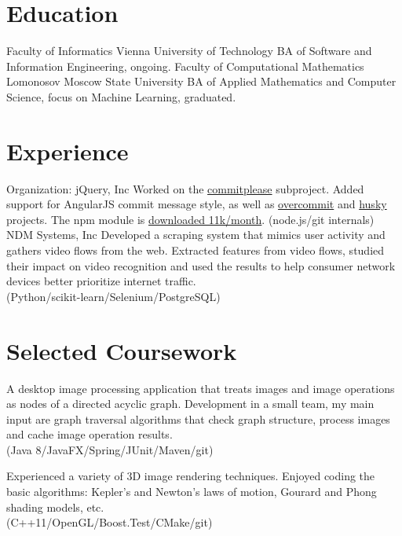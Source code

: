 \documentclass[11pt,a4paper,oneside,roman]{moderncv}
\begin{document}
\makecvtitle

\section{Education}
        {Faculty of Informatics}
        {Vienna University of Technology}
        {}{}
        {BA of Software and Information Engineering, ongoing.}
        {Faculty of Computational Mathematics}
        {Lomonosov Moscow State University}
        {}{}
        {BA of Applied Mathematics and Computer Science, focus on Machine Learning, graduated.}
\section{Experience}
        {Organization: jQuery, Inc}{}
        {}{Worked on the \href{https://github.com/jzaefferer/commitplease/}{commitplease} subproject. Added support for AngularJS commit message style, as well as \href{https://github.com/brigade/overcommit}{overcommit} and \href{https://github.com/typicode/husky}{husky} projects. The npm module is \href{https://www.npmjs.com/package/commitplease}{downloaded 11k/month}. (node.js/git internals)}
        {NDM Systems, Inc}
        {}{}
        {Developed a scraping system that mimics user activity and gathers video flows from the web. Extracted features from video flows, studied their impact on video recognition and used the results to help consumer network devices better prioritize internet traffic. \\ (Python/scikit-learn/Selenium/PostgreSQL)}

\section{Selected Coursework}
        {}{}{}{A desktop image processing application that treats images and image operations as nodes of a directed acyclic graph. Development in a small team, my main input are graph traversal algorithms that check graph structure, process images and cache image operation results. \\ (Java 8/JavaFX/Spring/JUnit/Maven/git)}

        {}{}{}{Experienced a variety of 3D image rendering techniques. Enjoyed coding the basic algorithms: Kepler's and Newton's laws of motion, Gourard and Phong shading models, etc. \\ (C++11/OpenGL/Boost.Test/CMake/git)}
\end{document}
